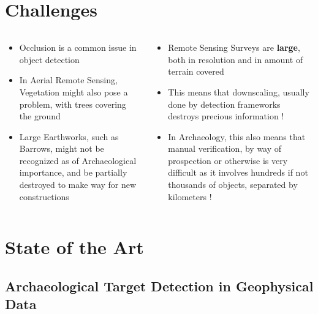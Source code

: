 \documentclass[aspectratio=169]{beamer}
\begin{document}
\section{Challenges}
\begin{frame}
	\begin{columns}[T] %
		\begin{column}{.48\textwidth}
		\begin{itemize}
			\item Occlusion is a common issue in object detection
			\item In Aerial Remote Sensing, Vegetation might also pose a problem, with trees covering the ground 
			\item Large Earthworks, such as Barrows, might not be recognized as of Archaeological importance, and be partially destroyed to make way for new constructions
		\end{itemize}
		\end{column}
			\hfill
		\begin{column}{.48\textwidth}
		\begin{itemize}
			\item Remote Sensing Surveys are \textbf{large}, both in resolution and in amount of terrain covered
			\item This means that downscaling, usually done by detection frameworks destroys precious information !
			\item In Archaeology, this also means that manual verification, by way of prospection or otherwise is very difficult as it involves hundreds if not thousands of objects, separated by kilometers !
		\end{itemize}
		\end{column}
	\end{columns}

\end{frame}


	\section{State of the Art}
	\subsection{Archaeological Target Detection in Geophysical Data}
\end{document}
